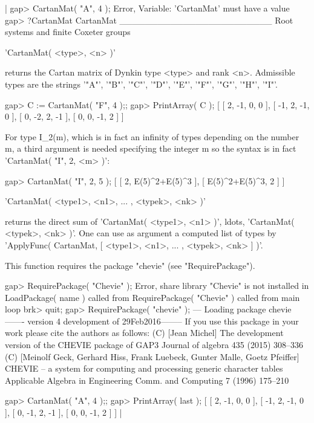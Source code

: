 |    gap> CartanMat( "A", 4 );
    Error, Variable: 'CartanMat' must have a value
    gap> ?CartanMat
    CartanMat ________________________ Root systems and finite Coxeter groups
    
    'CartanMat( <type>, <n> )'
    
    returns the Cartan matrix of Dynkin type  <type> and rank <n>. Admissible
    types are the  strings '"A"',   '"B"',   '"C"',    '"D"',   '"E"',   
    '"F"',    '"G"',   '"H"',   '"I"'.
    
        gap> C := CartanMat( "F", 4 );;
        gap> PrintArray( C );
        [ [   2,  -1,   0,   0 ],
          [  -1,   2,  -1,   0 ],
          [   0,  -2,   2,  -1 ],
          [   0,   0,  -1,   2 ] ]
    
    For type  I_2(m),  which is in fact an infinity of types depending on the
    number  m,  a third argument is needed specifying  the integer  m  so the
    syntax is in fact 'CartanMat(  "I",  2, <m> )':
    
        gap> CartanMat( "I", 2, 5 );
        [ [ 2, E(5)^2+E(5)^3 ], [ E(5)^2+E(5)^3, 2 ] ]
    
    'CartanMat( <type1>, <n1>, ... , <typek>, <nk> )'
                          
    returns the   direct sum  of   'CartanMat( <type1>, <n1> )',   ldots,
    'CartanMat( <typek>, <nk> )'. One can use as argument a computed list of 
    types by 'ApplyFunc( CartanMat, [ <type1>, <n1>, ... , <typek>, <nk> ] )'.
                          
    This function requires the package  "chevie"  (see "RequirePackage").
                          
    gap> RequirePackage( "Chevie" );
    Error, share library "Chevie" is not installed in
    LoadPackage( name ) called from
    RequirePackage( "Chevie" ) called from
    main loop
    brk> quit;
    gap> RequirePackage( "chevie" );
--- Loading package chevie ------- version 4 development of 29Feb2016--------
    If you use this package in your work please cite the authors as follows:
(C) [Jean Michel] The development version of the CHEVIE package of GAP3
     Journal of algebra 435 (2015) 308--336
(C) [Meinolf Geck, Gerhard Hiss, Frank Luebeck, Gunter Malle, Goetz Pfeiffer]
     CHEVIE -- a system for computing and processing generic character tables
     Applicable Algebra in Engineering Comm. and Computing 7 (1996) 175--210

    gap> CartanMat( "A", 4 );;
    gap> PrintArray( last );
    [ [   2,  -1,   0,   0 ],
      [  -1,   2,  -1,   0 ],
      [   0,  -1,   2,  -1 ],
      [   0,   0,  -1,   2 ] ]
|

